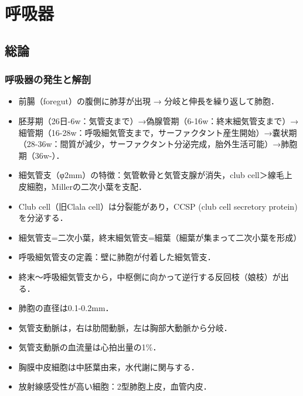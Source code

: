 

\section{呼吸器}
\subsection{総論}
\subsubsection{呼吸器の発生と解剖}
\begin{itemize}
\item 前腸（foregut）の腹側に肺芽が出現 → 分岐と伸長を繰り返して肺胞．
\item 胚芽期（26日-6w：気管支まで）→偽腺管期（6-16w：終末細気管支まで）→細管期（16-28w：呼吸細気管支まで，サーファクタント産生開始）→嚢状期（28-36w：間質が減少，サーファクタント分泌完成，胎外生活可能）→肺胞期（36w-）．
\item 細気管支（φ2mm）の特徴：気管軟骨と気管支腺が消失，club cell＞線毛上皮細胞，Millerの二次小葉を支配．
\item Club cell（旧Clala cell）は分裂能があり，CCSP (club cell secretory protein)を分泌する．
\item 細気管支=二次小葉，終末細気管支=細葉（細葉が集まって二次小葉を形成）
\item 呼吸細気管支の定義：壁に肺胞が付着した細気管支．
\item 終末〜呼吸細気管支から，中枢側に向かって逆行する反回枝（娘枝）が出る．
\item 肺胞の直径は0.1-0.2mm．
\item 気管支動脈は，右は肋間動脈，左は胸部大動脈から分岐．
\item 気管支動脈の血流量は心拍出量の1\%．
\item 胸膜中皮細胞は中胚葉由来，水代謝に関与する．
\item 放射線感受性が高い細胞：2型肺胞上皮，血管内皮．



\end{itemize}


